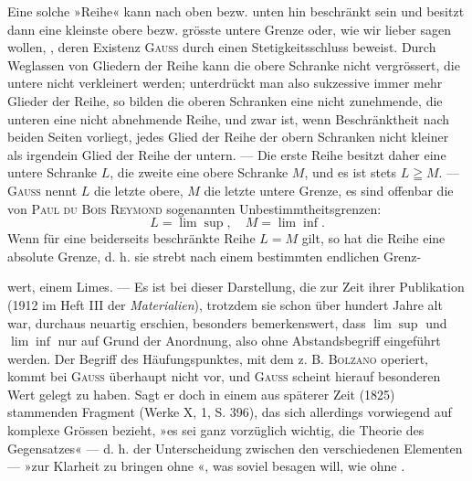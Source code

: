 Eine solche »Reihe« kann nach oben bezw. unten hin beschränkt sein
und besitzt dann eine kleinste obere bezw. grösste untere Grenze oder, wie wir
lieber sagen wollen, , deren Existenz \textsc{Gauss} durch einen Stetigkeitsschluss
beweist. Durch Weglassen von Gliedern der Reihe kann die obere
Schranke nicht vergrössert, die untere nicht verkleinert werden; unterdrückt
man also sukzessive immer mehr Glieder der Reihe, so bilden die oberen
Schranken eine nicht zunehmende, die unteren eine nicht abnehmende Reihe,
und zwar ist, wenn Beschränktheit nach beiden Seiten vorliegt, jedes Glied
der Reihe der obern Schranken nicht kleiner als irgendein Glied der Reihe
der untern. — Die erste Reihe besitzt daher eine untere Schranke \(L\), die
zweite eine obere Schranke \(M\), und es ist stets \(L\geqq M\). — \textsc{Gauss} nennt \(L\)
die letzte obere, \(M\) die letzte untere Grenze, es sind offenbar die von \textsc{Paul du
Bois Reymond} sogenannten Unbestimmtheitsgrenzen:
\[
L=\lim\sup,\quad M=\lim\inf.
\]
Wenn für eine beiderseits beschränkte Reihe \(L=M\) gilt, so hat die Reihe
eine absolute Grenze, d. h. sie strebt nach einem bestimmten endlichen Grenz-\par
\clearpage{}
\noindent wert, einem Limes. — Es ist bei dieser Darstellung, die zur Zeit ihrer Publikation
(1912 im Heft III der \textit{Materialien}), trotzdem sie schon über hundert
Jahre alt war, durchaus neuartig erschien, besonders bemerkenswert, dass
\(\lim\sup\) und \(\lim\inf\) nur auf Grund der Anordnung, also ohne Abstandsbegriff
eingeführt werden. Der Begriff des Häufungspunktes, mit dem z. B. \textsc{Bolzano}
operiert, kommt bei \textsc{Gauss} überhaupt nicht vor, und \textsc{Gauss} scheint hierauf
besonderen Wert gelegt zu haben. Sagt er doch in einem aus späterer Zeit
(1825) stammenden Fragment (Werke X, 1, S. 396), das sich allerdings vorwiegend
auf komplexe Grössen bezieht, »es sei ganz vorzüglich wichtig, die
Theorie des Gegensatzes« — d. h. der Unterscheidung zwischen den verschiedenen
Elementen — »zur Klarheit zu bringen ohne «, was soviel besagen
will, wie ohne .

